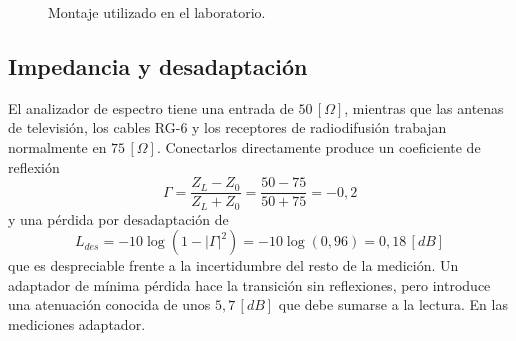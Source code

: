 \begin{figure}[H]
    \centering
    \caption{Montaje utilizado en el laboratorio.}
    \label{fig:montaje}
\end{figure}

\subsection{Impedancia y desadaptación}
El analizador de espectro tiene una entrada de $50 \, [\Omega]$, mientras que las antenas de televisión, los cables RG-6 y los receptores de radiodifusión trabajan normalmente en $75 \, [\Omega]$. Conectarlos directamente produce un coeficiente de reflexión
\begin{equation}
    \Gamma = \frac{Z_L - Z_0}{Z_L + Z_0} = \frac{50 - 75}{50 + 75} = -0{,}2
\end{equation}
y una pérdida por desadaptación de
\begin{equation}
    L_{des} = -10 \log\left(1 - |\Gamma|^2\right) = -10 \log(0{,}96) = 0{,}18 \, [dB]
\end{equation}
que es despreciable frente a la incertidumbre del resto de la medición. Un adaptador de mínima pérdida hace la transición sin reflexiones, pero introduce una atenuación conocida de unos $5{,}7 \, [dB]$ que debe sumarse a la lectura. En las mediciones  adaptador.
